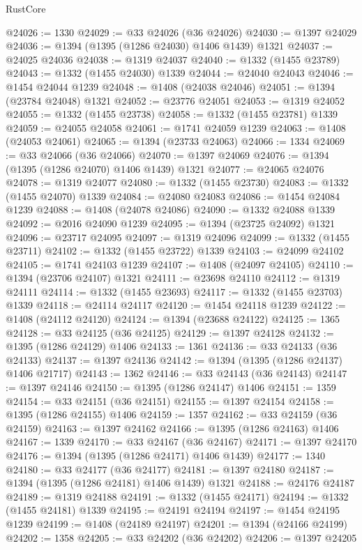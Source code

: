 \begin{lexlean}{RustCore}
\begin{coremodule}
@24026 := 1330
@24029 := @33 @24026 (@36 @24026)
@24030 := @1397 @24029
@24036 := @1394 (@1395 (@1286 @24030) @1406 @1439) @1321
@24037 := @24025 @24036
@24038 := @1319 @24037
@24040 := @1332 (@1455 @23789)
@24043 := @1332 (@1455 @24030) @1339
@24044 := @24040 @24043
@24046 := @1454 @24044 @1239
@24048 := @1408 (@24038 @24046)
@24051 := @1394 (@23784 @24048) @1321
@24052 := @23776 @24051
@24053 := @1319 @24052
@24055 := @1332 (@1455 @23738)
@24058 := @1332 (@1455 @23781) @1339
@24059 := @24055 @24058
@24061 := @1741 @24059 @1239
@24063 := @1408 (@24053 @24061)
@24065 := @1394 (@23733 @24063)
@24066 := 1334
@24069 := @33 @24066 (@36 @24066)
@24070 := @1397 @24069
@24076 := @1394 (@1395 (@1286 @24070) @1406 @1439) @1321
@24077 := @24065 @24076
@24078 := @1319 @24077
@24080 := @1332 (@1455 @23730)
@24083 := @1332 (@1455 @24070) @1339
@24084 := @24080 @24083
@24086 := @1454 @24084 @1239
@24088 := @1408 (@24078 @24086)
@24090 := @1332 @24088 @1339
@24092 := @2016 @24090 @1239
@24095 := @1394 (@23725 @24092) @1321
@24096 := @23717 @24095
@24097 := @1319 @24096
@24099 := @1332 (@1455 @23711)
@24102 := @1332 (@1455 @23722) @1339
@24103 := @24099 @24102
@24105 := @1741 @24103 @1239
@24107 := @1408 (@24097 @24105)
@24110 := @1394 (@23706 @24107) @1321
@24111 := @23698 @24110
@24112 := @1319 @24111
@24114 := @1332 (@1455 @23693)
@24117 := @1332 (@1455 @23703) @1339
@24118 := @24114 @24117
@24120 := @1454 @24118 @1239
@24122 := @1408 (@24112 @24120)
@24124 := @1394 (@23688 @24122)
@24125 := 1365
@24128 := @33 @24125 (@36 @24125)
@24129 := @1397 @24128
@24132 := @1395 (@1286 @24129) @1406
@24133 := 1361
@24136 := @33 @24133 (@36 @24133)
@24137 := @1397 @24136
@24142 := @1394 (@1395 (@1286 @24137) @1406 @21717)
@24143 := 1362
@24146 := @33 @24143 (@36 @24143)
@24147 := @1397 @24146
@24150 := @1395 (@1286 @24147) @1406
@24151 := 1359
@24154 := @33 @24151 (@36 @24151)
@24155 := @1397 @24154
@24158 := @1395 (@1286 @24155) @1406
@24159 := 1357
@24162 := @33 @24159 (@36 @24159)
@24163 := @1397 @24162
@24166 := @1395 (@1286 @24163) @1406
@24167 := 1339
@24170 := @33 @24167 (@36 @24167)
@24171 := @1397 @24170
@24176 := @1394 (@1395 (@1286 @24171) @1406 @1439)
@24177 := 1340
@24180 := @33 @24177 (@36 @24177)
@24181 := @1397 @24180
@24187 := @1394 (@1395 (@1286 @24181) @1406 @1439) @1321
@24188 := @24176 @24187
@24189 := @1319 @24188
@24191 := @1332 (@1455 @24171)
@24194 := @1332 (@1455 @24181) @1339
@24195 := @24191 @24194
@24197 := @1454 @24195 @1239
@24199 := @1408 (@24189 @24197)
@24201 := @1394 (@24166 @24199)
@24202 := 1358
@24205 := @33 @24202 (@36 @24202)
@24206 := @1397 @24205

\end{coremodule}
\end{lexlean}
